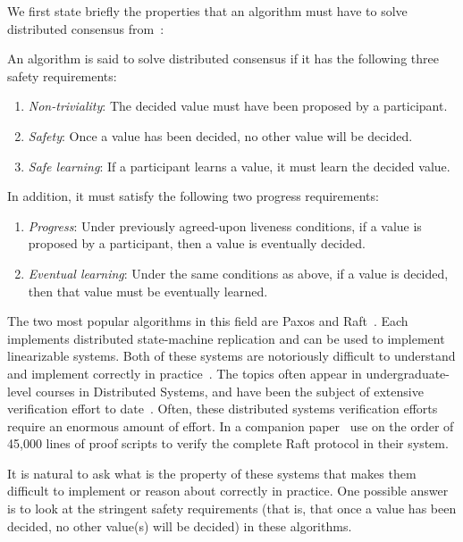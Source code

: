 We first state briefly the properties that an algorithm must have to solve
distributed consensus from~\citet{howard19}:
\begin{definition}
  \label{def:consensus}
  An algorithm is said to solve distributed consensus if it has the following
  three safety requirements:
  \begin{enumerate}
    \item \emph{Non-triviality}: The decided value must have been proposed by a
      participant.
    \item \emph{Safety}: Once a value has been decided, no other value will be
      decided.
    \item \emph{Safe learning}: If a participant learns a value, it must learn
      the decided value.
  \end{enumerate}
  In addition, it must satisfy the following two progress requirements:
  \begin{enumerate}
    \item \emph{Progress}: Under previously agreed-upon liveness conditions, if
      a value is proposed by a participant, then a value is eventually decided.
    \item \emph{Eventual learning}: Under the same conditions as above, if a
      value is decided, then that value must be eventually learned.
  \end{enumerate}
\end{definition}

The two most popular algorithms in this field are Paxos and
Raft~\citep{howard20,lamport98,ongaro14}. Each implements distributed
state-machine replication and can be used to implement linearizable systems.
Both of these systems are notoriously difficult to understand and implement
correctly in practice~\citep{howard20}. The topics often appear in
undergraduate-level courses in Distributed Systems, and have been the subject of
extensive verification effort to date~\citep{wilcox15}. Often, these distributed
systems verification efforts require an enormous amount of effort.  In a
companion paper~\citet{woos16} use on the order of 45,000 lines of proof scripts
to verify the complete Raft protocol in their system.

It is natural to ask what is the property of these systems that makes them
difficult to implement or reason about correctly in practice. One possible
answer is to look at the stringent safety requirements (that is, that once a
value has been decided, no other value(s) will be decided) in these algorithms.

